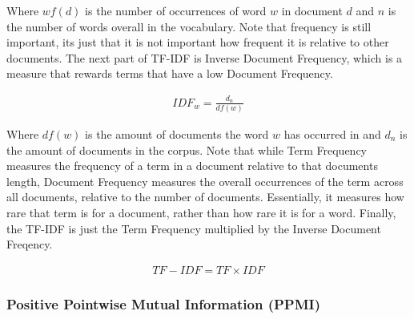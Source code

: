Where ${wf}(d)$ is the number of occurrences of word $w$ in document $d$ and $n$ is the number of words overall in the vocabulary. Note that frequency is still important, its just that it is not important how frequent it is relative to other documents.  The next part of TF-IDF is Inverse Document Frequency, which is a measure that rewards terms that have a low Document Frequency. 

\begin{align*}
IDF_{w} =  \frac{d_n}{{df}(w)} 
\end{align*}

Where ${df}(w)$ is the amount of documents the word $w$ has occurred in and $d_n$ is the amount of documents in the corpus. Note that while Term Frequency measures the frequency of a term in a document relative to that documents length, Document Frequency measures the overall occurrences of the term across all documents, relative to the number of documents. Essentially, it measures how rare that term is for a document, rather than how rare it is for a word. Finally, the TF-IDF is just the Term Frequency multiplied by the Inverse Document Freqency.

\begin{align*}
{TF-IDF} = TF \times IDF
\end{align*}


\subsubsection{Positive Pointwise Mutual Information (PPMI)}







